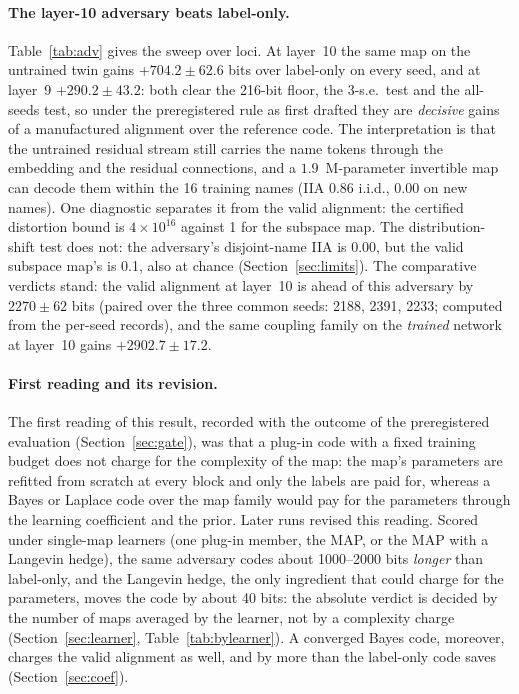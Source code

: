 \documentclass[11pt,a4paper]{article}
\begin{document}
\paragraph{The layer-10 adversary beats label-only.} Table~\ref{tab:adv} gives the sweep over loci. At layer~10 the same map on the untrained twin gains $+704.2\pm62.6$ bits over label-only on every seed, and at layer~9 $+290.2\pm43.2$: both clear the 216-bit floor, the 3-s.e.\ test and the all-seeds test, so under the preregistered rule as first drafted they are \emph{decisive} gains of a manufactured alignment over the reference code. The interpretation is that the untrained residual stream still carries the name tokens through the embedding and the residual connections, and a $1.9$~M-parameter invertible map can decode them within the 16 training names (IIA 0.86 i.i.d., 0.00 on new names). One diagnostic separates it from the valid alignment: the certified distortion bound is $4\times10^{16}$ against 1 for the subspace map. The distribution-shift test does not: the adversary's disjoint-name IIA is 0.00, but the valid subspace map's is 0.1, also at chance (Section~\ref{sec:limits}). The comparative verdicts stand: the valid alignment at layer~10 is ahead of this adversary by $2270\pm62$ bits (paired over the three common seeds: 2188, 2391, 2233; computed from the per-seed records), and the same coupling family on the \emph{trained} network at layer~10 gains $+2902.7\pm17.2$.

\paragraph{First reading and its revision.} The first reading of this result, recorded with the outcome of the preregistered evaluation (Section~\ref{sec:gate}), was that a plug-in code with a fixed training budget does not charge for the complexity of the map: the map's parameters are refitted from scratch at every block and only the labels are paid for, whereas a Bayes or Laplace code over the map family would pay for the parameters through the learning coefficient and the prior. Later runs revised this reading. Scored under single-map learners (one plug-in member, the MAP, or the MAP with a Langevin hedge), the same adversary codes about 1000--2000 bits \emph{longer} than label-only, and the Langevin hedge, the only ingredient that could charge for the parameters, moves the code by about 40 bits: the absolute verdict is decided by the number of maps averaged by the learner, not by a complexity charge (Section~\ref{sec:learner}, Table~\ref{tab:bylearner}). A converged Bayes code, moreover, charges the valid alignment as well, and by more than the label-only code saves (Section~\ref{sec:coef}).
\end{document}
